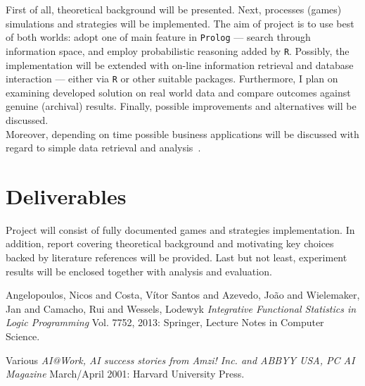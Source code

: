 \documentclass[12pt,a4paper,twocolumn]{article}
\begin{document}
First of all, theoretical background will be presented. Next, processes (games) simulations and strategies will be implemented. The aim of project is to use best of both worlds: adopt one of main feature in \texttt{Prolog} --- search through information space, and employ probabilistic reasoning added by \texttt{R}. Possibly, the implementation will be extended with on-line information retrieval and database interaction --- either via \texttt{R} or other suitable packages. Furthermore, I plan on examining developed solution on real world data and compare outcomes against genuine (archival) results. Finally, possible improvements and alternatives will be discussed.\\

Moreover, depending on time possible business applications will be discussed with regard to simple data retrieval and analysis~\cite{prolog/horseracing}.\\


\section*{Deliverables} %
Project will consist of fully documented games and strategies implementation. In addition, report covering theoretical background and motivating key choices backed by literature references will be provided. Last but not least, experiment results will be enclosed together with analysis and evaluation.\\


\begin{thebibliography}{1}
   Angelopoulos, Nicos and Costa, Vítor Santos and Azevedo, João and Wielemaker, Jan and Camacho, Rui and Wessels, Lodewyk {\em Integrative Functional Statistics in Logic Programming} Vol. 7752, 2013: Springer, Lecture Notes in Computer Science.

   Various {\em AI@Work, AI success stories from Amzi! Inc. and ABBYY USA, PC AI Magazine} March/April 2001: Harvard University Press.
\end{thebibliography}
\end{document}
